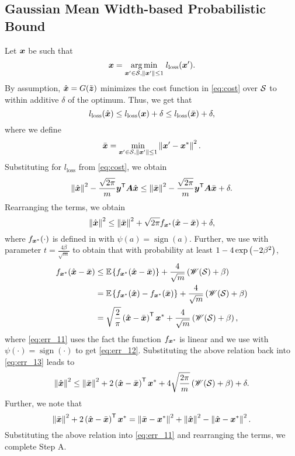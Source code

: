 \documentclass[journal]{IEEEtran}
\newcommand{\wid}{\mathscr{W}}
\DeclareMathOperator{\sign}{sign}
\begin{document}
\subsection{Gaussian Mean Width-based Probabilistic Bound}
Let $\boldsymbol{x}$ be such that 
\begin{equation}
    \boldsymbol{x} = \underset{\boldsymbol{x}'\in\mathcal{S},\left\Vert\boldsymbol{x}'\right\Vert\leq 1}{\arg\min}\; l_{\mathrm{loss}}(\boldsymbol{x}').
\end{equation}
By assumption, $\hat{\boldsymbol{x}}=G(\tilde{\boldsymbol{z}})$ minimizes the cost function in \eqref{eq:cost} over $\mathcal{S}$ to within additive $\delta$ of the optimum. Thus, we get that
\begin{equation}
l_{\mathrm{loss}}(\hat{\boldsymbol{x}}) \leq l_{\mathrm{loss}}(\boldsymbol{x})+\delta  \leq l_{\mathrm{loss}}(\bar{\boldsymbol{x}})+\delta,
\end{equation}
where we define
\begin{equation}
    \bar{\boldsymbol{x}} = \underset{\boldsymbol{x}'\in\mathcal{S},\left\Vert\boldsymbol{x}'\right\Vert\leq 1}{\min}\left\Vert \boldsymbol{x}'-\boldsymbol{x}^*\right\Vert^2.
\end{equation}
Substituting for $l_{\mathrm{loss}}$ from \eqref{eq:cost}, we obtain
\begin{equation}
     \left\Vert\hat{\boldsymbol{x}}\right\Vert^2-\frac{\sqrt{2\pi}}{m} \boldsymbol{y}^{\mathsf{T}}\boldsymbol{A}\hat{\boldsymbol{x}}\leq \left\Vert\bar{\boldsymbol{x}}\right\Vert^2-\frac{\sqrt{2\pi}}{m} \boldsymbol{y}^{\mathsf{T}}\boldsymbol{A}\bar{\boldsymbol{x}} +\delta.
\end{equation}
Rearranging the terms, we obtain
\begin{equation}\label{eq:err_13}
\left\Vert\hat{\boldsymbol{x}}\right\Vert^2\leq \left\Vert\bar{\boldsymbol{x}}\right\Vert^2+ \sqrt{2\pi}f_{\boldsymbol{x}^*}(\hat{\boldsymbol{x}}-\bar{\boldsymbol{x}})+\delta,
\end{equation}
where $f_{\boldsymbol{x}^*}(\cdot)$ is defined in  with  $\psi(a)=\sign(a)$. 
Further, we use  with parameter $t=\frac{4\beta}{\sqrt{m}}$ to obtain that with probability at least $1-4\exp\left(-2\beta^2\right)$,
\begin{align}
f_{\vecx^*}(\hat{\vecx}-\bar{\vecx})& \leq \expect{\!}{f_{\vecx^*}(\hat{\vecx}-\bar{\vecx})}+\frac{4}{\sqrt{m}}\lb\wid(\calS)+\beta\rb\\
& =\expect{\!}{f_{\vecx^*}(\hat{\vecx})-f_{\vecx^*}(\bar{\vecx})}+\frac{4}{\sqrt{m}}\lb\wid(\calS)+\beta\rb\label{eq:err_11}\\
&= \sqrt{\frac{2}{\pi}}\lb\hat{\vecx}-\bar{\vecx}\rb\tran\vecx^*+\frac{4}{\sqrt{m}}\lb\wid(\calS)+\beta\rb,\label{eq:err_12}
\end{align}
where \eqref{eq:err_11} uses the fact the function $f_{\boldsymbol{x}^*}$ is linear and  we use  with $\psi(\cdot)=\sign(\cdot)$ to get \eqref{eq:err_12}.
Substituting the above relation back into \eqref{eq:err_13} leads to
\begin{equation}
\lV\hat{\vecx}\rV^2\leq \lV\bar{\vecx}\rV^2+2\lb\hat{\vecx}-\bar{\vecx}\rb\tran\vecx^*+4\sqrt{\frac{2\pi}{m}}\lb\wid(\calS)+\beta\rb+\delta.
\end{equation}
Further, we note that
\begin{equation}\label{eq:indentity}
    \left\Vert\bar{\boldsymbol{x}}\right\Vert^2+2\left(\hat{\boldsymbol{x}}-\bar{\boldsymbol{x}}\right)^{\mathsf{T}}\boldsymbol{x}^*= \left\Vert\bar{\boldsymbol{x}}-\boldsymbol{x}^*\right\Vert^2+\left\Vert\hat{\boldsymbol{x}}\right\Vert^2-\left\Vert\hat{\boldsymbol{x}}-\boldsymbol{x}^*\right\Vert^2.
\end{equation}
Substituting the above relation into \eqref{eq:err_11} and rearranging the terms, we complete Step A.
\end{document}
